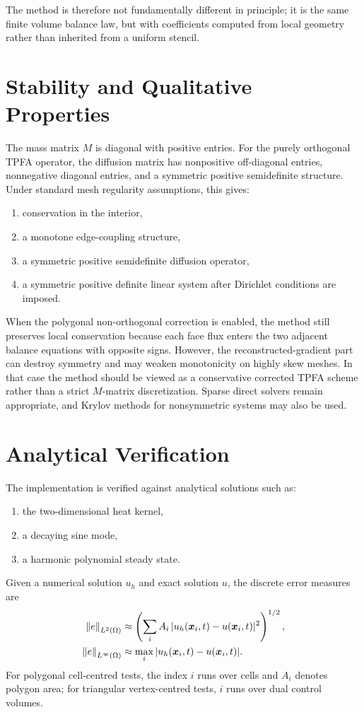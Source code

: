 \documentclass[11pt]{article}
\theoremstyle{plain}
\theoremstyle{definition}
\theoremstyle{remark}
\numberwithin{equation}{section}
\begin{document}
The method is therefore not fundamentally different in principle; it is the same finite volume balance law, but with coefficients computed from local geometry rather than inherited from a uniform stencil.

\section{Stability and Qualitative Properties}
The mass matrix $M$ is diagonal with positive entries. For the purely orthogonal TPFA operator, the diffusion matrix has nonpositive off-diagonal entries, nonnegative diagonal entries, and a symmetric positive semidefinite structure. Under standard mesh regularity assumptions, this gives:
\begin{enumerate}[label=\arabic*.]
\item conservation in the interior,
\item a monotone edge-coupling structure,
\item a symmetric positive semidefinite diffusion operator,
\item a symmetric positive definite linear system after Dirichlet conditions are imposed.
\end{enumerate}
When the polygonal non-orthogonal correction is enabled, the method still preserves local conservation because each face flux enters the two adjacent balance equations with opposite signs. However, the reconstructed-gradient part can destroy symmetry and may weaken monotonicity on highly skew meshes. In that case the method should be viewed as a conservative corrected TPFA scheme rather than a strict $M$-matrix discretization. Sparse direct solvers remain appropriate, and Krylov methods for nonsymmetric systems may also be used.

\section{Analytical Verification}
The implementation is verified against analytical solutions such as:
\begin{enumerate}[label=\arabic*.]
\item the two-dimensional heat kernel,
\item a decaying sine mode,
\item a harmonic polynomial steady state.
\end{enumerate}

Given a numerical solution $u_h$ and exact solution $u$, the discrete error measures are
\begin{align}
\norm{e}_{L^2(\Omega)} &\approx \left( \sum_i A_i \, |u_h(\bm{x}_i,t) - u(\bm{x}_i,t)|^2 \right)^{1/2}, \label{eq:l2_error} \\
\norm{e}_{L^\infty(\Omega)} &\approx \max_i |u_h(\bm{x}_i,t) - u(\bm{x}_i,t)|. \label{eq:linf_error}
\end{align}
For polygonal cell-centred tests, the index $i$ runs over cells and $A_i$ denotes polygon area; for triangular vertex-centred tests, $i$ runs over dual control volumes.
\end{document}
